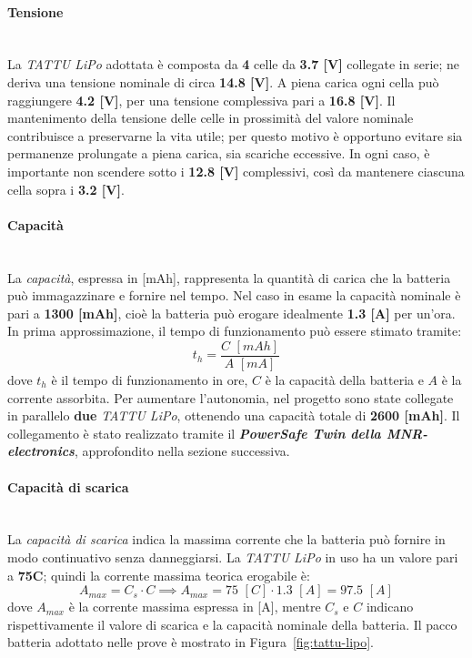 \documentclass[11pt]{report}
\begin{document}
	\paragraph{\small{Tensione}}\mbox{}\\
	La \textit{TATTU LiPo} adottata è composta da \textbf{4} celle da \textbf{3.7 [V]} collegate in serie; ne deriva una tensione nominale di circa \textbf{14.8 [V]}. A piena carica ogni cella può raggiungere \textbf{4.2 [V]}, per una tensione complessiva pari a \textbf{16.8 [V]}.
	Il mantenimento della tensione delle celle in prossimità del valore nominale contribuisce a preservarne la vita utile; per questo motivo è opportuno evitare sia permanenze prolungate a piena carica, sia scariche eccessive. In ogni caso, è importante non scendere sotto i \textbf{12.8 [V]} complessivi, così da mantenere ciascuna cella sopra i \textbf{3.2 [V]}.
	
	\paragraph{\small{Capacità}}\mbox{}\\
	La \textit{capacità}, espressa in [mAh], rappresenta la quantità di carica che la batteria può immagazzinare e fornire nel tempo. Nel caso in esame la capacità nominale è pari a \textbf{1300 [mAh]}, cioè la batteria può erogare idealmente \textbf{1.3 [A]} per un'ora. In prima approssimazione, il tempo di funzionamento può essere stimato tramite:
	\begin{equation}
		t_h = \frac{C\,\,[mAh]}{A\,\,[mA]}
	\end{equation}
	dove $t_h$ è il tempo di funzionamento in ore, $C$ è la capacità della batteria e $A$ è la corrente assorbita. Per aumentare l'autonomia, nel progetto sono state collegate in parallelo \textbf{due} \textit{TATTU LiPo}, ottenendo una capacità totale di \textbf{2600 [mAh]}. Il collegamento è stato realizzato tramite il \textit{\textbf{PowerSafe Twin della MNR-electronics}}, approfondito nella sezione successiva.
	
	\paragraph{\small{Capacità di scarica}}\mbox{}\\
	La \textit{capacità di scarica} indica la massima corrente che la batteria può fornire in modo continuativo senza danneggiarsi. La \textit{TATTU LiPo} in uso ha un valore pari a \textbf{75C}; quindi la corrente massima teorica erogabile è:
	\begin{equation}
		A_{max} = C_s\cdot C \implies A_{max} = 75\,\,[C]\cdot 1.3\,\,[A]= 97.5\,\,[A]
	\end{equation}
	dove $A_{max}$ è la corrente massima espressa in [A], mentre $C_s$ e $C$ indicano rispettivamente il valore di scarica e la capacità nominale della batteria. Il pacco batteria adottato nelle prove è mostrato in Figura~\ref{fig:tattu-lipo}.
	
\end{document}
